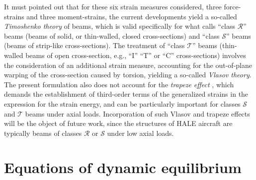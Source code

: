\documentclass[12pt,a4paper,oneside,english]{abntex2} %
\begin{document}
It must pointed out that for these six strain measures considered, three force-strains and three moment-strains, the current developments yield a so-called \textit{Timoshenko theory} of beams, which is valid specifically for what  calls ``class $\mathcal{R}$'' beams (beams of solid, or thin-walled, closed cross-sections) and ``class $\mathcal{S}$'' beams (beams of strip-like cross-sections). The treatment of ``class $\mathcal{T}$'' beams (thin-walled beams of open cross-section, e.g., ``I'' ``T'' or ``C'' cross-sections) involves the consideration of an additional strain measure, accounting for the out-of-plane warping of the cross-section caused by torsion, yielding a so-called \textit{Vlasov theory}. The present formulation also does not account for the \textit{trapeze effect} \cite{hodges2006nonlinear}, which demands the establishment of third-order terms of the generalized strains in the expression for the strain energy, and can be particularly important for classes $\mathcal{S}$ and $\mathcal{T}$ beams under axial loads. Incorporation of such Vlasov and trapeze effects will be the object of future work, since the structures of HALE aircraft are typically beams of classes $\mathcal{R}$ or $\mathcal{S}$ under low axial loads.


\section{Equations of dynamic equilibrium}
\label{sec:ede}
\end{document}
